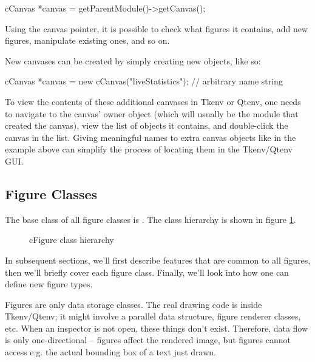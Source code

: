 \begin{cpp}
cCanvas *canvas = getParentModule()->getCanvas();
\end{cpp}

Using the canvas pointer, it is possible to check what figures it
contains, add new figures, manipulate existing ones, and so on.

New canvases can be created by simply creating new 
objects, like so:

\begin{cpp}
cCanvas *canvas = new cCanvas("liveStatistics"); // arbitrary name string
\end{cpp}

To view the contents of these additional canvases in Tkenv or Qtenv, one
needs to navigate to the canvas' owner object (which will usually be the
module that created the canvas), view the list of objects it contains, and
double-click the canvas in the list. Giving meaningful names to extra
canvas objects like in the example above can simplify the process of
locating them in the Tkenv/Qtenv GUI.


\subsection{Figure Classes}
\label{sec:graphics:figure-classes}

The base class of all figure classes is . The class hierarchy
is shown in figure \ref{fig:figure-inheritance}.

\begin{figure}[htbp]
  \begin{center}
    
    \caption{cFigure class hierarchy}
    \label{fig:figure-inheritance}
  \end{center}
\end{figure}

In subsequent sections, we'll first describe features that are common
to all figures, then we'll briefly cover each figure class. Finally,
we'll look into how one can define new figure types.

\begin{note}
Figures are only data storage classes. The real drawing code is inside
Tkenv/Qtenv; it might involve a parallel data structure, figure renderer classes, etc.
When an inspector is not open, these things don't exist. Therefore, data flow
is only one-directional -- figures affect the rendered image, but figures
cannot access e.g. the actual bounding box of a text just drawn.
\end{note}


